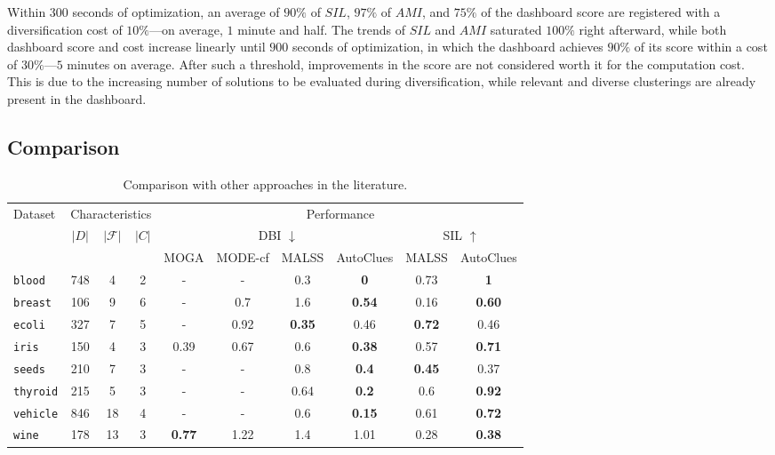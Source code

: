 \documentclass[runningheads]{llncs}
\begin{document}
Within $300$ seconds of optimization, an average of $90\%$ of $SIL$, $97\%$ of $AMI$, and $75\%$ of the dashboard score are registered with a diversification cost of $10\%$---on average, $1$ minute and half.
The trends of $SIL$ and $AMI$ saturated $100\%$ right afterward, while both dashboard score and cost increase linearly until $900$ seconds of optimization, in which the dashboard achieves $90\%$ of its score within a cost of $30\%$---$5$ minutes on average.
After such a threshold, improvements in the score are not considered worth it for the computation cost.
This is due to the increasing number of solutions to be evaluated during diversification, while relevant and diverse clusterings are already present in the dashboard.

\subsection{Comparison}\label{ssec:comparison}

\begin{table}[t]
    \centering
    \begin{tabular}{l|ccc|cccc|cc}
    \hline
        \multirow{3}{*}{Dataset} & \multicolumn{3}{c|}{Characteristics} & \multicolumn{6}{c}{Performance} \\
        & \multirow{2}{*}{$|D|$} & \multirow{2}{*}{$|\mathcal{F}|$} & \multirow{2}{*}{$|C|$} & \multicolumn{4}{c|}{DBI $\downarrow$} & \multicolumn{2}{c}{SIL $\uparrow$} \\
        & & & & \multicolumn{1}{c}{MOGA} & \multicolumn{1}{c}{MODE-cf} & \multicolumn{1}{c}{MALSS} & \multicolumn{1}{c|}{AutoClues} & \multicolumn{1}{c}{MALSS} & \multicolumn{1}{c}{AutoClues} \\ \hline
        \texttt{blood} & 748 & 4 & 2 & - & - & 0.3 & \textbf{0} & 0.73 & \textbf{1} \\ 
        \texttt{breast} & 106 & 9 & 6 & - & 0.7 & 1.6 & \textbf{0.54} & 0.16 & \textbf{0.60} \\ 
        \texttt{ecoli} & 327 & 7 & 5 & - & 0.92 & \textbf{0.35} & 0.46 & \textbf{0.72} & 0.46 \\ 
        \texttt{iris} & 150 & 4 & 3 & 0.39 & 0.67 & 0.6 & \textbf{0.38} & 0.57 & \textbf{0.71} \\
        \texttt{seeds} & 210 & 7 & 3 & - & - & 0.8 & \textbf{0.4} & \textbf{0.45} & 0.37 \\
        \texttt{thyroid} & 215 & 5 & 3 & - & - & 0.64 & \textbf{0.2} & 0.6 & \textbf{0.92} \\ 
        \texttt{vehicle} & 846 & 18 & 4 & - & - & 0.6 & \textbf{0.15} & 0.61 & \textbf{0.72} \\ 
        \texttt{wine} & 178 & 13 & 3 & \textbf{0.77} & 1.22 & 1.4 & 1.01 & 0.28 & \textbf{0.38} \\ \hline
    \end{tabular}
    \caption{Comparison with other approaches in the literature.}
    \label{tbl:comparison}
\end{table}
\end{document}
